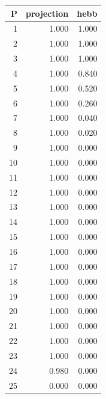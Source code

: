 \begin{tabular}{rrr}
\toprule
P & projection & hebb \\
\midrule
1 & 1.000 & 1.000 \\
2 & 1.000 & 1.000 \\
3 & 1.000 & 1.000 \\
4 & 1.000 & 0.840 \\
5 & 1.000 & 0.520 \\
6 & 1.000 & 0.260 \\
7 & 1.000 & 0.040 \\
8 & 1.000 & 0.020 \\
9 & 1.000 & 0.000 \\
10 & 1.000 & 0.000 \\
11 & 1.000 & 0.000 \\
12 & 1.000 & 0.000 \\
13 & 1.000 & 0.000 \\
14 & 1.000 & 0.000 \\
15 & 1.000 & 0.000 \\
16 & 1.000 & 0.000 \\
17 & 1.000 & 0.000 \\
18 & 1.000 & 0.000 \\
19 & 1.000 & 0.000 \\
20 & 1.000 & 0.000 \\
21 & 1.000 & 0.000 \\
22 & 1.000 & 0.000 \\
23 & 1.000 & 0.000 \\
24 & 0.980 & 0.000 \\
25 & 0.000 & 0.000 \\
\bottomrule
\end{tabular}
